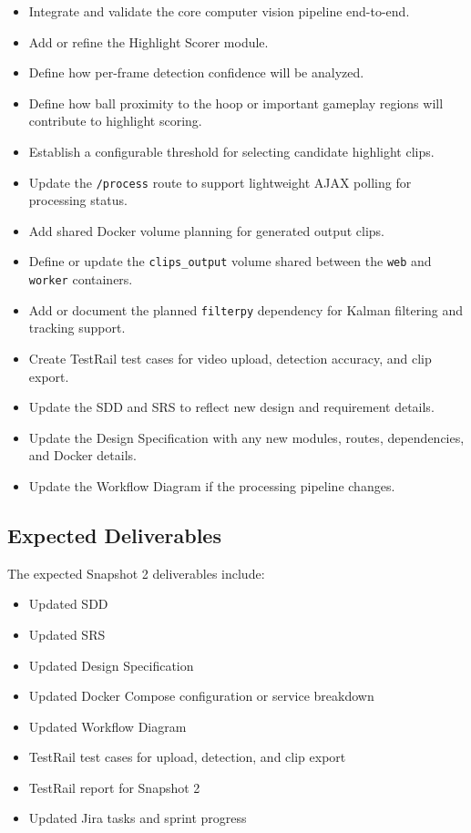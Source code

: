 \documentclass[12pt]{article}
\begin{document}
\begin{itemize}[noitemsep]
    \item Integrate and validate the core computer vision pipeline end-to-end.
    \item Add or refine the Highlight Scorer module.
    \item Define how per-frame detection confidence will be analyzed.
    \item Define how ball proximity to the hoop or important gameplay regions will contribute to highlight scoring.
    \item Establish a configurable threshold for selecting candidate highlight clips.
    \item Update the \texttt{/process} route to support lightweight AJAX polling for processing status.
    \item Add shared Docker volume planning for generated output clips.
    \item Define or update the \texttt{clips\_output} volume shared between the \texttt{web} and \texttt{worker} containers.
    \item Add or document the planned \texttt{filterpy} dependency for Kalman filtering and tracking support.
    \item Create TestRail test cases for video upload, detection accuracy, and clip export.
    \item Update the SDD and SRS to reflect new design and requirement details.
    \item Update the Design Specification with any new modules, routes, dependencies, and Docker details.
    \item Update the Workflow Diagram if the processing pipeline changes.
\end{itemize}

\subsection{Expected Deliverables}
The expected Snapshot 2 deliverables include:

\begin{itemize}[noitemsep]
    \item Updated SDD
    \item Updated SRS
    \item Updated Design Specification
    \item Updated Docker Compose configuration or service breakdown
    \item Updated Workflow Diagram
    \item TestRail test cases for upload, detection, and clip export
    \item TestRail report for Snapshot 2
    \item Updated Jira tasks and sprint progress
\end{itemize}
\end{document}
